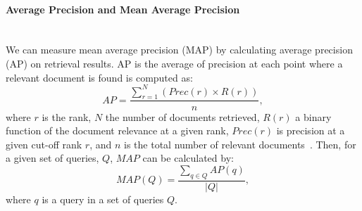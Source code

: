 \paragraph{Average Precision and Mean Average Precision}
\ \\
We can measure mean average precision (MAP) by calculating average precision (AP) on retrieval results. AP is the average of precision at each point where a relevant document is found is computed as:
\begin{equation}
AP=\frac{\sum\limits_{r=1}^{N}(Prec(r)\times R(r))}{n},
\end{equation}
\noindent
where $ r $ is the rank, $ N $ the number of documents retrieved, $ R(r) $ a binary function of the document relevance at a given rank, $ Prec(r) $ is precision at a given cut-off rank $ r $, and $ n $ is the total number of relevant documents~\citep{manning2008introduction}.
Then, for a given set of queries, $ Q $, $ MAP $ can be calculated by:
\begin{equation}
MAP(Q)=\frac{\sum\limits_{q\in Q}AP(q)}{|Q|},
\end{equation}
\noindent
where $ q $ is a query in a set of queries $ Q $.